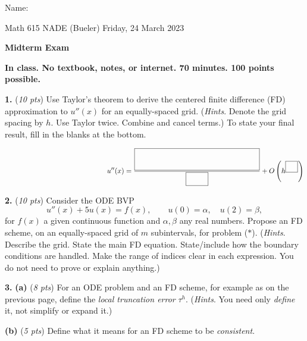 \documentclass[11pt]{amsart}
\newcommand{\prob}[1]{\bigskip\noindent\textbf{#1.} }
\newcommand{\pts}[1]{(\emph{#1 pts})}
\newcommand{\probpts}[2]{\prob{#1} \pts{#2}}
\newcommand{\ppartpts}[2]{\textbf{(#1)} \pts{#2}}
\newcommand{\epartpts}[2]{\medskip\noindent \textbf{(#1)} \pts{#2}}
\begin{document}
\hfill \Large Name:\underline{\phantom{Ed Bueler really really long long long name}}
\medskip

\scriptsize \noindent Math 615 NADE (Bueler) \hfill Friday, 24 March 2023
\medskip

\Large\centerline{\textbf{Midterm Exam}}

\smallskip
\large
\begin{center}
\textbf{In class.  No textbook, notes, or internet.  70 minutes.  100 points possible.}
\end{center}

\medskip

\thispagestyle{empty}

\normalsize
\probpts{1}{10}   Use Taylor's theorem to derive the centered finite difference (FD) approximation to $u''(x)$ for an equally-spaced grid.  (\emph{Hints}.  Denote the grid spacing by $h$.  Use Taylor twice.  Combine and cancel terms.)  To state your final result, fill in the blanks at the bottom.
\vfill

{\large
$$\hspace{2.0in} u''(x) = \frac{\boxed{\begin{matrix}  \phantom{sdkljfa sdakfl asdfklj asdf asdlfkj asdf} \\ \phantom{kjads} \end{matrix}}}{\boxed{\strut\phantom{ksdjf}}} + O\left(h^{\boxed{\phantom{jf}}}\right)$$
}
\bigskip

\newpage
\probpts{2}{10}   Consider the ODE BVP
\begin{equation}
    u''(x) + 5 u(x) = f(x), \qquad u(0)=\alpha, \quad u(2) = \beta,   \tag{$\ast$}
\end{equation}
for $f(x)$ a given continuous function and $\alpha,\beta$ any real numbers.  Propose an FD scheme, on an equally-spaced grid of $m$ subintervals, for problem ($\ast$).  (\emph{Hints}.  Describe the grid.  State the main FD equation.  State/include how the boundary conditions are handled.  Make the range of indices clear in each expression.  You do not need to prove or explain anything.)
\vspace{3.5in}


\newpage
\prob{3}  \ppartpts{a}{8}   For an ODE problem and an FD scheme, for example as on the previous page, define the \emph{local truncation error} $\tau^h$.  (\emph{Hints}.  You need only \emph{define} it, not simplify or expand it.)
\vfill

\epartpts{b}{5}   Define what it means for an FD scheme to be \emph{consistent}.
\vspace{2.0in}
\end{document}
